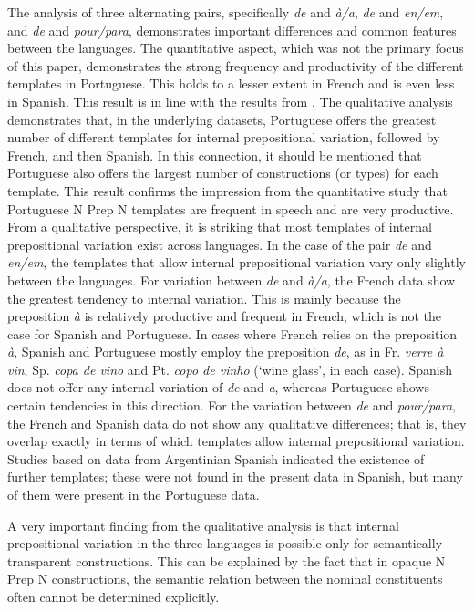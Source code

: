 \documentclass[output=paper]{langsci/langscibook}
\begin{document}
The analysis of three alternating pairs, specifically \textit{de} and \textit{à/a}, \textit{de} and \textit{en/em}, and \textit{de} and \textit{pour/para}, demonstrates important differences and common features between the languages. The quantitative aspect, which was not the primary focus of this paper, demonstrates the strong frequency and productivity of the different templates in Portuguese. This holds to a lesser extent in French and is even less in Spanish. This result is in line with the results from \citet{Hennecke:2017}. The qualitative analysis demonstrates that, in the underlying datasets, Portuguese offers the greatest number of different templates for internal prepositional variation, followed by French, and then Spanish. In this connection, it should be mentioned that Portuguese also offers the largest number of constructions (or types) for each template. This result confirms the impression from the quantitative study that Portuguese N Prep N templates are frequent in speech and are very productive. From a qualitative perspective, it is striking that most templates of internal prepositional variation exist across languages. In the case of the pair \textit{de} and \textit{en/em}, the templates that allow internal prepositional variation vary only slightly between the languages. For variation between \textit{de} and \textit{à/a}, the French data show the greatest tendency to internal variation. This is mainly because the preposition \textit{à} is relatively productive and frequent in French, which is not the case for Spanish and Portuguese. In cases where French relies on the preposition \textit{à}, Spanish and Portuguese mostly employ the preposition \textit{de}, as in Fr. \textit{verre à vin}, Sp. \textit{copa de vino} and Pt. \textit{copo de vinho} (`wine glass', in each case). Spanish does not offer any internal variation of \textit{de} and \textit{a}, whereas Portuguese shows certain tendencies in this direction. For the variation between \textit{de} and \textit{pour/para}, the French and Spanish data do not show any qualitative differences; that is, they overlap exactly in terms of which templates allow internal prepositional variation. Studies based on data from Argentinian Spanish indicated the existence of further templates; these were not found in the present data in Spanish, but many of them were present in the Portuguese data.

A very important finding from the qualitative analysis is that internal prepositional variation in the three languages is possible only for semantically transparent constructions. This can be explained by the fact that in opaque N Prep N constructions, the semantic relation between the nominal constituents often cannot be determined explicitly.
\end{document}
